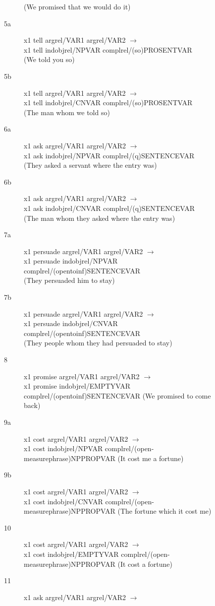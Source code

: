 \begin{description}
\begin{description}
\begin{description}
(We promised that we would do it)
  \item[5a] x1 tell argrel/VAR1 argrel/VAR2 $\rightarrow$ \\
x1 tell indobjrel/NPVAR complrel/(so)PROSENTVAR \\
(We told you so)
  \item[5b] x1 tell argrel/VAR1 argrel/VAR2 $\rightarrow$ \\
x1 tell indobjrel/CNVAR complrel/(so)PROSENTVAR \\
(The man whom we told so)
  \item[6a] x1 ask argrel/VAR1 argrel/VAR2 $\rightarrow$ \\
x1 ask indobjrel/NPVAR complrel/(q)SENTENCEVAR \\
(They asked a servant where the entry was)
  \item[6b] x1 ask argrel/VAR1 argrel/VAR2 $\rightarrow$ \\
x1 ask indobjrel/CNVAR complrel/(q)SENTENCEVAR \\
(The man whom they asked where the entry was)
  \item[7a] x1 persuade argrel/VAR1 argrel/VAR2 $\rightarrow$ \\
x1 persuade indobjrel/NPVAR complrel/(opentoinf)SENTENCEVAR \\
(They persuaded him to stay)
  \item[7b] x1 persuade argrel/VAR1 argrel/VAR2 $\rightarrow$ \\
x1 persuade indobjrel/CNVAR complrel/(opentoinf)SENTENCEVAR \\
(They people whom they had persuaded to stay)
  \item[8] x1 promise argrel/VAR1 argrel/VAR2 $\rightarrow$ \\
x1 promise indobjrel/EMPTYVAR complrel/(opentoinf)SENTENCEVAR 
(We promised to come back)
  \item[9a] x1 cost argrel/VAR1 argrel/VAR2 $\rightarrow$ \\
x1 cost indobjrel/NPVAR complrel/(open-measurephrase)NPPROPVAR
(It cost me a fortune)
  \item[9b] x1 cost argrel/VAR1 argrel/VAR2 $\rightarrow$ \\
x1 cost indobjrel/CNVAR complrel/(open-measurephrase)NPPROPVAR
(The fortune which it cost me)
  \item[10] x1 cost argrel/VAR1 argrel/VAR2 $\rightarrow$ \\
x1 cost indobjrel/EMPTYVAR complrel/(open-measurephrase)NPPROPVAR
(It cost a fortune)
  \item[11] x1 ask argrel/VAR1 argrel/VAR2 $\rightarrow$ \\

\end{description}
\end{description}
\end{description}
